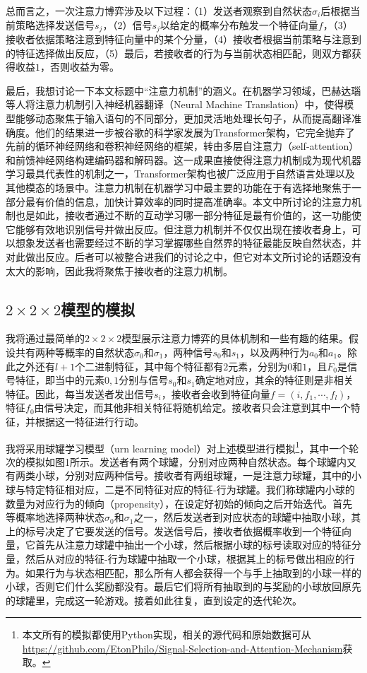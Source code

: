 \documentclass[12pt]{ctexart}  %
\begin{document}
总而言之，一次注意力博弈涉及以下过程：（1）发送者观察到自然状态$\sigma_i$后根据当前策略选择发送信号$s_j$，（2）信号$s_j$以给定的概率分布触发一个特征向量$f$，（3）接收者依据策略注意到特征向量中的某个分量，（4）接收者根据当前策略与注意到的特征选择做出反应，（5）最后，若接收者的行为与当前状态相匹配，则双方都获得收益$1$，否则收益为零。

最后，我想讨论一下本文标题中“注意力机制”的涵义。在机器学习领域，巴赫达瑙等人将注意力机制引入神经机器翻译（Neural Machine Translation）中，使得模型能够动态聚焦于输入语句的不同部分，更加灵活地处理长句子，从而提高翻译准确度。\cite{attention_translation}他们的结果进一步被谷歌的科学家发展为Transformer架构，它完全抛弃了先前的循环神经网络和卷积神经网络的框架，转由多层自注意力（self-attention）和前馈神经网络构建编码器和解码器。\cite{attention_alluneed}这一成果直接使得注意力机制成为现代机器学习最具代表性的机制之一，Transformer架构也被广泛应用于自然语言处理以及其他模态的场景中。\cite{attention_vision}注意力机制在机器学习中最主要的功能在于有选择地聚焦于一部分最有价值的信息，加快计算效率的同时提高准确率。本文中所讨论的注意力机制也是如此，接收者通过不断的互动学习哪一部分特征是最有价值的，这一功能使它能够有效地识别信号并做出反应。但注意力机制并不仅仅出现在接收者身上，可以想象发送者也需要经过不断的学习掌握哪些自然界的特征最能反映自然状态，并对此做出反应。后者可以被整合进我们的讨论之中，但它对本文所讨论的话题没有太大的影响，因此我将聚焦于接收者的注意力机制。

\subsection{$2\times 2\times 2$模型的模拟}
我将通过最简单的$2\times 2\times 2$模型展示注意力博弈的具体机制和一些有趣的结果。假设共有两种等概率的自然状态$\sigma_0$和$\sigma_1$，两种信号$s_0$和$s_1$，以及两种行为$a_0$和$a_1$。除此之外还有$l+1$个二进制特征，其中每个特征都有$2$元素，分别为$0$和$1$，且$F_0$是信号特征，即当中的元素$0,1$分别与信号$s_0$和$s_1$确定地对应，其余的特征则是非相关特征。因此，每当发送者发出信号$s_i$，接收者会收到特征向量$f=(i,f_1,\cdots,f_l)$，特征$f_0$由信号决定，而其他非相关特征将随机给定。接收者只会注意到其中一个特征，并根据这一特征进行行动。

我将采用球罐学习模型（urn learning model）对上述模型进行模拟\footnote{本文所有的模拟都使用Python实现，相关的源代码和原始数据可从\url{https://github.com/EtonPhilo/Signal-Selection-and-Attention-Mechanism}获取。}，其中一个轮次的模拟如图1所示。发送者有两个球罐，分别对应两种自然状态。每个球罐内又有两类小球，分别对应两种信号。接收者有两组球罐，一是注意力球罐，其中的小球与特定特征相对应，二是不同特征对应的特征-行为球罐。我们称球罐内小球的数量为对应行为的倾向（propensity），在设定好初始的倾向之后开始迭代。首先等概率地选择两种状态$\sigma_0$和$\sigma_1$之一，然后发送者到对应状态的球罐中抽取小球，其上的标号决定了它要发送的信号。发送信号后，接收者依据概率收到一个特征向量，它首先从注意力球罐中抽出一个小球，然后根据小球的标号读取对应的特征分量，然后从对应的特征-行为球罐中抽取一个小球，根据其上的标号做出相应的行为。如果行为与状态相匹配，那么所有人都会获得一个与手上抽取到的小球一样的小球，否则它们什么奖励都没有。最后它们将所有抽取到的与奖励的小球放回原先的球罐里，完成这一轮游戏。接着如此往复，直到设定的迭代轮次。
\end{document}
